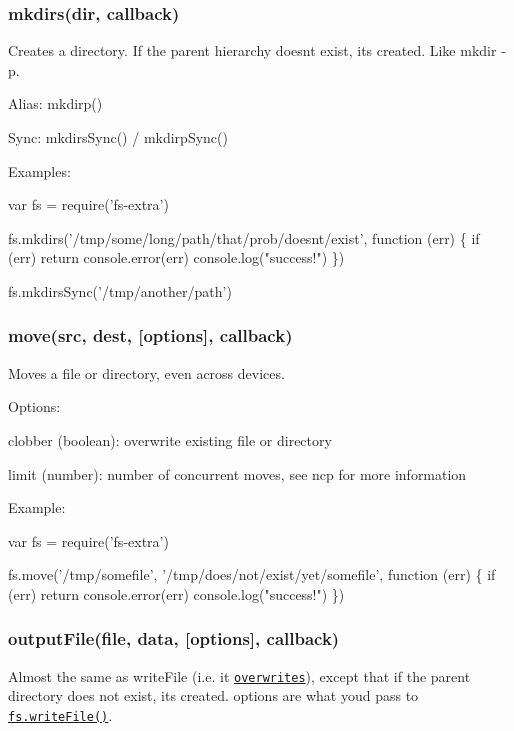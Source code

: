 \subsubsection*{mkdirs(dir, callback)}

Creates a directory. If the parent hierarchy doesn\textquotesingle{}t exist, it\textquotesingle{}s created. Like {\ttfamily mkdir -\/p}.

Alias\+: {\ttfamily mkdirp()}

Sync\+: {\ttfamily mkdirs\+Sync()} / {\ttfamily mkdirp\+Sync()}

Examples\+:


\begin{DoxyCode}
var fs = require('fs-extra')

fs.mkdirs('/tmp/some/long/path/that/prob/doesnt/exist', function (err) \{
  if (err) return console.error(err)
  console.log("success!")
\})

fs.mkdirsSync('/tmp/another/path')
\end{DoxyCode}


\subsubsection*{move(src, dest, \mbox{[}options\mbox{]}, callback)}

Moves a file or directory, even across devices.

Options\+:
\begin{DoxyItemize}
\item clobber (boolean)\+: overwrite existing file or directory
\item limit (number)\+: number of concurrent moves, see ncp for more information
\end{DoxyItemize}

Example\+:


\begin{DoxyCode}
var fs = require('fs-extra')

fs.move('/tmp/somefile', '/tmp/does/not/exist/yet/somefile', function (err) \{
  if (err) return console.error(err)
  console.log("success!")
\})
\end{DoxyCode}


\subsubsection*{output\+File(file, data, \mbox{[}options\mbox{]}, callback)}

Almost the same as {\ttfamily write\+File} (i.\+e. it \href{http://pages.citebite.com/v2o5n8l2f5reb}{\tt overwrites}), except that if the parent directory does not exist, it\textquotesingle{}s created. {\ttfamily options} are what you\textquotesingle{}d pass to \href{https://nodejs.org/api/fs.html#fs_fs_writefile_file_data_options_callback}{\tt {\ttfamily fs.\+write\+File()}}.

